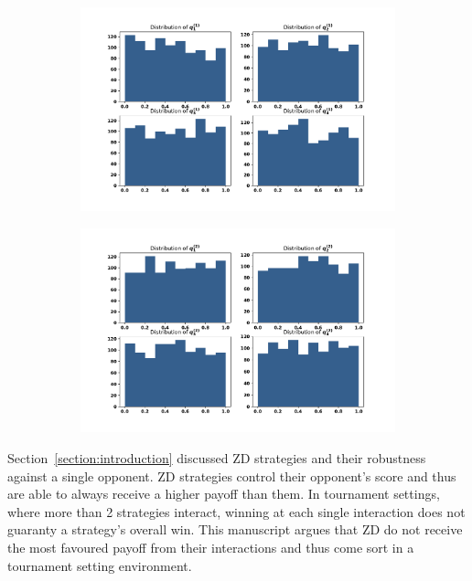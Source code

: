 \documentclass[10pt]{article}
\begin{document}
\begin{figure}[!htbp]
    \begin{subfigure}{0.49\textwidth}
        \centering
        \includegraphics[width=\linewidth]{img/first_opponent_probabilities.pdf}
        \label{fig:opponents_probabilities}
    \end{subfigure}
    \begin{subfigure}{0.49\textwidth}
        \centering
        \includegraphics[width=\linewidth]{img/second_opponent_probabilities.pdf}
        \label{fig:opponents_probabilities}
    \end{subfigure}
\end{figure}

Section~\ref{section:introduction} discussed ZD strategies and their robustness
against a single opponent. ZD strategies control their opponent's score and thus
are able to always receive a higher payoff than them. In tournament settings,
where more than 2 strategies interact, winning at each single interaction does
not guaranty a strategy's overall win. This manuscript argues that ZD do not
receive the most favoured payoff from their interactions and thus come sort in a
tournament setting environment.
\end{document}
